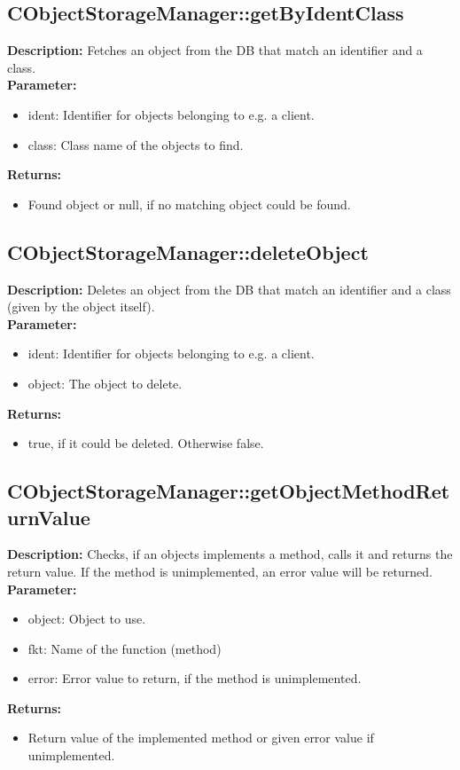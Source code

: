 \subsection{CObjectStorageManager::getByIdentClass}
\textbf{Description:} Fetches an object from the DB that match an identifier and a class.\\
\textbf{Parameter:}
\begin{itemize}
\item ident: Identifier for objects belonging to e.g. a client.
\item class: Class name of the objects to find.
\end{itemize}
\textbf{Returns:}
\begin{itemize}
\item Found object or null, if no matching object could be found.
\end{itemize}

\subsection{CObjectStorageManager::deleteObject}
\textbf{Description:} Deletes an object from the DB that match an identifier and a class (given by the object itself).\\
\textbf{Parameter:}
\begin{itemize}
\item ident: Identifier for objects belonging to e.g. a client.
\item object: The object to delete.
\end{itemize}
\textbf{Returns:}
\begin{itemize}
\item true, if it could be deleted. Otherwise false.
\end{itemize}

\subsection{CObjectStorageManager::getObjectMethodReturnValue}
\textbf{Description:} Checks, if an objects implements a method, calls it and returns the return value. If the method is unimplemented, an error value will be returned.\\
\textbf{Parameter:}
\begin{itemize}
\item object: Object to use.
\item fkt: Name of the function (method)
\item error: Error value to return, if the method is unimplemented.
\end{itemize}
\textbf{Returns:}
\begin{itemize}
\item Return value of the implemented method or given error value if unimplemented.
\end{itemize}

